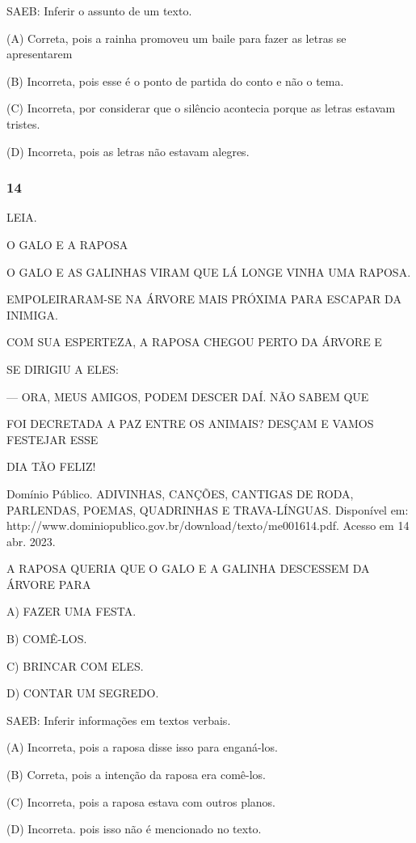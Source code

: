 SAEB: Inferir o assunto de um texto.

(A)  Correta, pois a rainha promoveu um baile para fazer as letras se apresentarem 

(B)  Incorreta, pois esse é o ponto de partida do conto e não o tema. 

(C) Incorreta, por considerar que o silêncio acontecia porque as letras estavam tristes. 

(D) Incorreta, pois as letras não estavam alegres.

\subsubsection{14}\label{section-86}

LEIA.

O GALO E A RAPOSA

O GALO E AS GALINHAS VIRAM QUE LÁ LONGE VINHA UMA RAPOSA.

EMPOLEIRARAM-SE NA ÁRVORE MAIS PRÓXIMA PARA ESCAPAR DA INIMIGA.

COM SUA ESPERTEZA, A RAPOSA CHEGOU PERTO DA ÁRVORE E

SE DIRIGIU A ELES:

--- ORA, MEUS AMIGOS, PODEM DESCER DAÍ. NÃO SABEM QUE

FOI DECRETADA A PAZ ENTRE OS ANIMAIS? DESÇAM E VAMOS FESTEJAR ESSE

DIA TÃO FELIZ!

Domínio Público. ADIVINHAS, CANÇÕES, CANTIGAS DE RODA, PARLENDAS, POEMAS, QUADRINHAS E TRAVA-LÍNGUAS. Disponível em: http://www.dominiopublico.gov.br/download/texto/me001614.pdf. Acesso em 14 abr. 2023.

A RAPOSA QUERIA QUE O GALO E A GALINHA DESCESSEM DA ÁRVORE PARA

A) FAZER UMA FESTA.

B) COMÊ-LOS.

C) BRINCAR COM ELES.

D) CONTAR UM SEGREDO.

SAEB: Inferir informações em textos verbais.

(A) Incorreta, pois a raposa disse isso para enganá-los.

(B) Correta, pois a intenção da raposa era comê-los.

(C) Incorreta, pois a raposa estava com outros planos.

(D) Incorreta. pois isso não é mencionado no texto.\protect\hypertarget{_heading=h.jyvxl0weyrwn}{}{}

